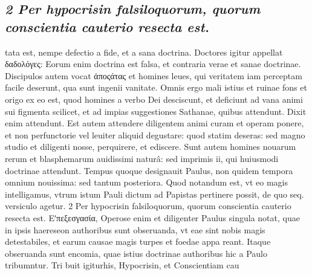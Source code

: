 \documentclass{article}
\begin{document}
\begin{pages}
\subsection*{\textit{2 Per hypocrisin falsiloquorum, quorum conscientia cauterio resecta est.}}tata est, nempe defectio a fide, et a sana doctrina. Doctores igitur appellat δαδολόγες: Eorum enim doctrina est falsa, et contraria verae et sanae doctrinae. Discipulos autem vocat ἀποςάτας et homines leues, qui veritatem iam perceptam facile deserunt, qua sunt ingenii vanitate. Omnis ergo mali istius et ruinae fons et origo ex eo est, quod homines a verbo Dei desciscunt, et deficiunt ad vana animi sui figmenta scilicet, et ad impias suggestiones Sathanae, quibus attendunt. Dixit enim attendunt. Est autem attendere diligentem animi curam et operam ponere, et non perfunctorie vel leuiter aliquid degustare: quod statim deseras: sed magno studio et diligenti nosse, perquirere, et ediscere. Sunt autem homines nouarum rerum et blasphemarum auidissimi naturâ: sed imprimis ii, qui huiusmodi doctrinae attendunt. Tempus quoque designauit Paulus, non quidem tempora omnium nouissima: sed tantum posteriora. Quod notandum est, vt eo magis intelligamus, vtrum istum Pauli dictum ad Papistas pertinere possit, de quo seq. versiculo agetur. 2 Per hypocrisin falsiloquorum, quorum conscientia cauterio resecta est. Εʹπεξεσγασία, Operose enim et diligenter Paulus singula notat, quae in ipsis haereseon authoribus sunt obseruanda, vt eae sint nobis magis detestabiles, et earum causae magis turpes et foedae appa reant. Itaque obseruanda sunt encomia, quae istius doctrinae authoribus hic a Paulo tribumntur. Tri buit igiturhis, Hypocrisin, et Conscientiam cau  \pend

\end{pages}
\end{document}
